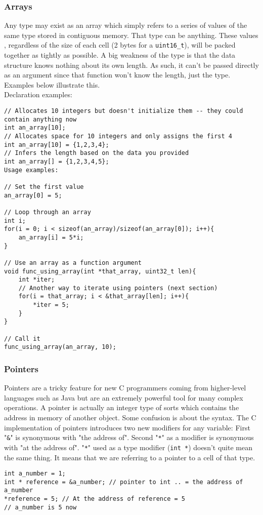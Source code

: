 \documentclass[10pt]{article}
\begin{document}
\subsubsection{Arrays}

Any type may exist as an array which simply refers to a series of values of the same type stored in contiguous memory. That type can be anything. These values , regardless of the size of each cell (2 bytes for a \texttt{uint16\_t}), will be packed together as tightly as possible.  A big weakness of the type is that the data structure knows nothing about its own length. As such, it can’t be passed directly as an argument since that function won’t know the length, just the type. Examples below illustrate this. \\

Declaration examples:
\begin{lstlisting}[label=lst-arrays,caption=Arrays]
// Allocates 10 integers but doesn't initialize them -- they could contain anything now
int an_array[10]; 
// Allocates space for 10 integers and only assigns the first 4
int an_array[10] = {1,2,3,4};
// Infers the length based on the data you provided
int an_array[] = {1,2,3,4,5};
Usage examples:

// Set the first value
an_array[0] = 5;

// Loop through an array
int i;
for(i = 0; i < sizeof(an_array)/sizeof(an_array[0]); i++){
	an_array[i] = 5*i;
}

// Use an array as a function argument
void func_using_array(int *that_array, uint32_t len){
	int *iter;
	// Another way to iterate using pointers (next section)
	for(i = that_array; i < &that_array[len]; i++){
		*iter = 5;
	} 
}

// Call it
func_using_array(an_array, 10);
\end{lstlisting}

\subsubsection{Pointers}\label{sec:pointers}

Pointers are a tricky feature for new C programmers coming from higher-level languages such as Java but are an extremely powerful tool for many complex operations. A pointer is actually an integer type of sorts which contains the address in memory of another object. Some confusion is about the syntax. The C implementation of pointers introduces two new modifiers for any variable: First "\texttt{\&}" is synonymous with "the address of". Second "\texttt{*}" as a modifier is synonymous with "at the address of". "\texttt{*}" used as a type modifier (\texttt{int *}) doesn't quite mean the same thing. It means that we are referring to a pointer to a cell of that type.
\begin{lstlisting}[label=lst-pointer-syntax,caption=Pointer syntax]
int a_number = 1;
int * reference = &a_number; // pointer to int .. = the address of a_number
*reference = 5; // At the address of reference = 5
// a_number is 5 now
\end{lstlisting}
\end{document}
